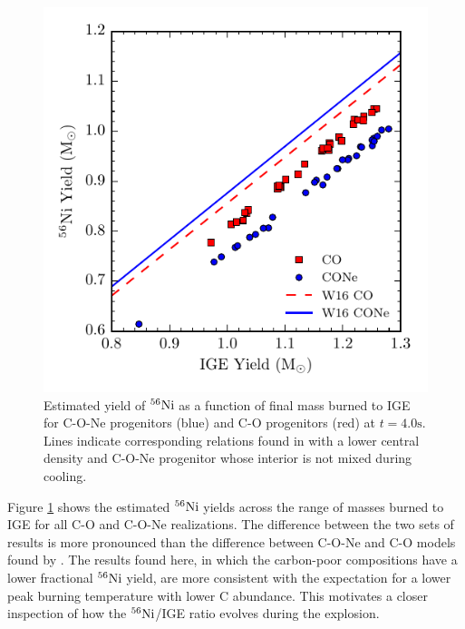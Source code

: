 \documentclass[preprint2]{aastex63}
\newcommand{\Ni}[1]{\ensuremath{{}^{#1}{\rm Ni}}}
\newcommand{\unitstyle}[1]{\ensuremath{\mathrm{#1}}}
\newcommand{\second}{\unitstyle{s}}
\begin{document}
\begin{figure}
\includegraphics[width=\columnwidth]{figures/ni56_v_ige.pdf}
\caption{\label{fig:conversion}
Estimated yield of \Ni{56} as a function of final mass burned to IGE
for C-O-Ne progenitors (blue) and C-O progenitors (red) at
$t = 4.0 \second$.  Lines indicate corresponding relations found in 
\cite{willcoxetal2016} with
a lower central density and C-O-Ne progenitor whose interior is not mixed
during cooling.
}
\end{figure}
Figure \ref{fig:conversion} shows the estimated \Ni{56} yields
across the range of masses burned to IGE
for all C-O and C-O-Ne realizations.
The difference between the two sets of results is more pronounced
than the difference between C-O-Ne and C-O models found by \citet{willcoxetal2016}.
The results found here, in which the carbon-poor compositions have a lower fractional \Ni{56} yield, are more consistent with the expectation for a lower peak burning temperature with lower C abundance.
This motivates a closer inspection of how the \Ni{56}/IGE ratio evolves during the explosion.
\end{document}
